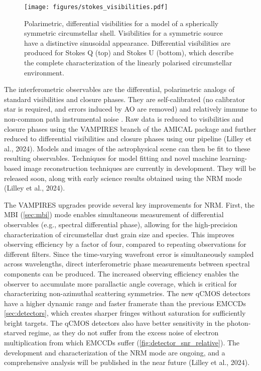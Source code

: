 \begin{figure}[h]
\centering
    \texttt{[image: figures/stokes\_visibilities.pdf]}
    \caption{Polarimetric, differential visibilities for a model of a spherically symmetric circumstellar shell. Visibilities for a symmetric source have a distinctive sinusoidal appearance. Differential visibilities are produced for Stokes Q (top) and Stokes U (bottom), which describe the complete characterization of the linearly polarised circumstellar environment. \label{fig:diff_vis_all}}
\end{figure}

The interferometric observables are the differential, polarimetric analogs of standard visibilities and closure phases. They are self-calibrated (no calibrator star is required, and errors induced by AO are removed) and relatively immune to non-common path instrumental noise \citep{norris_vampires_2015}. Raw data is reduced to visibilities and closure phases using the VAMPIRES branch of the AMICAL package \citep{soulain_james_2020} and further reduced to differential visibilities and closure phases using our pipeline (Lilley et al., 2024). Models and images of the astrophysical scene can then be fit to these resulting observables. Techniques for model fitting and novel machine learning-based image reconstruction techniques are currently in development. They will be released soon, along with early science results obtained using the NRM mode (Lilley et al., 2024). 
 
The VAMPIRES upgrades provide several key improvements for NRM. First, the MBI (\autoref{sec:mbi}) mode enables simultaneous measurement of differential observables (e.g., spectral differential phase), allowing for the high-precision characterization of circumstellar dust grain size and species. This improves observing efficiency by a factor of four, compared to repeating observations for different filters. Since the time-varying wavefront error is simultaneously sampled across wavelengths, direct interferometric phase measurements between spectral components can be produced. The increased observing efficiency enables the observer to accumulate more parallactic angle coverage, which is critical for characterizing non-azimuthal scattering symmetries. The new qCMOS detectors have a higher dynamic range and faster framerate than the previous EMCCDs \autoref{sec:detectors}, which creates sharper fringes without saturation for sufficiently bright targets. The qCMOS detectors also have better sensitivity in the photon-starved regime, as they do not suffer from the excess noise of electron multiplication from which EMCCDs suffer (\autoref{fig:detector_snr_relative}). 
The development and characterization of the NRM mode are ongoing, and a comprehensive analysis will be published in the near future (Lilley et al., 2024).


